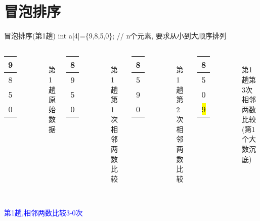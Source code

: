\section{冒泡排序}

\begin{frame}{冒泡排序(第1趟)}
int a[4]=\{9,8,5,0\}; // n个元素, 要求从小到大顺序排列
\begin{columns}[T]
	\begin{tabular}{|c|}
		\hline 
		9 \\ 
		\hline 
		8 \\ 
		\hline 
		5 \\ 
		\hline
		0 \\
	    \hline 
	\end{tabular}\\ 
    第1趟原始数据
	\pause
	\begin{tabular}{|c|}
		\hline 
		8 \\ 
		\hline 
		9 \\ 
		\hline 
		5 \\ 
		\hline
		0 \\
		\hline  
	\end{tabular}\\ 
    第1趟第1次相邻两数比较
    \pause
    \begin{tabular}{|c|}
    	\hline 
    	8 \\ 
    	\hline 
    	5 \\ 
    	\hline 
    	9 \\ 
    	\hline 
    	0 \\
    	\hline 
    \end{tabular}\\ 
    第1趟第2次相邻两数比较
    \pause
    \begin{tabular}{|c|}
    	\hline 
    	8 \\ 
    	\hline 
    	5 \\ 
    	\hline 
    	0 \\ 
    	\hline 
    	\colorbox{yellow}{9} \\
    	\hline 
    \end{tabular}\\ 
    第1趟第3次相邻两数比较(第1个大数沉底)
\end{columns}
~\\
\textcolor{blue}{第1趟,相邻两数比较3-0次}
\end{frame}

